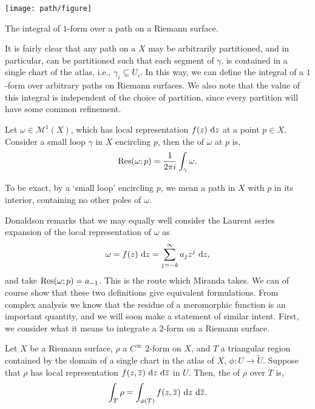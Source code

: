 \begin{marginfigure}
	\centering
	\texttt{[image: path/figure]}
	\caption{The integral of $ 1 $-form over a path on a Riemann surface.}
\end{marginfigure}

It is fairly clear that any path on a $ X $ may be arbitrarily partitioned, and in
particular, can be partitioned such that each segment of $ \gamma $, is
contained in a single chart of the atlas, i.e., $ \gamma_i \subseteq U_i $. In
this way, we can define the integral of a $ 1 $-form over arbitrary paths on
Riemann surfaces. We also note that the value of this integral is independent of
the choice of partition, since every partition will have some common refinement.

\begin{definition}[Residue]
	Let $ \omega \in \mathcal{M}^{1}(X) $, which has local representation $ f(z)
		\operatorname{\, d\!}{z} $ at a point $ p \in X $. Consider a small loop $ \gamma $ in $ X $
	encircling $ p $, then the  of $ \omega $ at $ p $ is,
	\begin{align*}
		\operatorname{Res}(\omega;p) = \frac{1}{2 \pi i}\int_{\gamma}^{}{\omega}.
	\end{align*}
\end{definition}

\begin{remark}
	To be exact, by a `small loop' encircling $ p $, we mean a path in $ X $ with
	$ p $ in its interior, containing no other poles of $ \omega $.
\end{remark}

Donaldson remarks that we may
equally well consider the Laurent series expansion of the local representation
of $ \omega $ as
\begin{align*}
	\omega = f(z) \operatorname{\, d\!}{z} = \sum_{j=-k}^{\infty}{a_jz^j} \operatorname{\, d\!}{z},
\end{align*}
and take $ \operatorname{Res}(\omega;p)=a _{-1} $. This is the route which
Miranda takes. We can of course
show that these two definitions give equivalent formulations. From complex
analysis we know that the residue of a meromorphic function is an important
quantity, and we will soon make a statement of similar intent. First, we
consider what it means to integrate a $ 2 $-form on a Riemann surface.

\begin{definition}
	Let $ X $ be a Riemann surface, $ \rho $ a $ C ^{\infty} $ $ 2 $-form on $ X
	$, and $ T $ a triangular region contained by the domain of a single chart in
	the atlas of $ X $,  $ \phi:U \to \tilde{U} $. Suppose that $ \rho $ has local
	representation $ f(z, \overline{z})\operatorname{\, d\!}{z}\operatorname{\, d\!}{\overline{z}} $ in $ U $. Then, the
	 of $ \rho $ over $ T $ is,
	\begin{align*}
		\int_{T}^{}{\rho} = \int_{\phi(T)}^{}{f(z,
		\overline{z})\operatorname{\, d\!}{z}\operatorname{\, d\!}{\overline{z}}}.
	\end{align*}
\end{definition}

